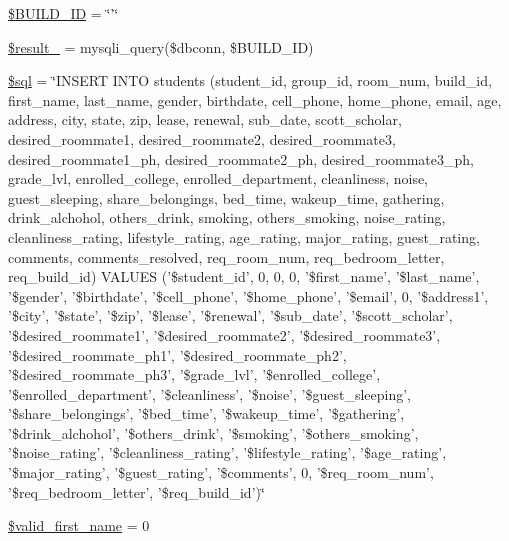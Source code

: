 \begin{DoxyCompactItemize}
\item 
\hyperlink{user__view_2validate_2studentVal_8php_a4003cf8da4c94911cef7e69853cbac42}{\$\-B\-U\-I\-L\-D\-\_\-\-I\-D} = \char`\"{}'\char`\"{}
\item 
\hyperlink{user__view_2validate_2studentVal_8php_a0b3f63d6f969a6ad92963ceae90afab9}{\$result\-\_} = mysqli\-\_\-query(\$dbconn, \$\-B\-U\-I\-L\-D\-\_\-\-I\-D)
\item 
\hyperlink{user__view_2validate_2studentVal_8php_a047170d6020a882807665812a27e2525}{\$sql} = \char`\"{}\-I\-N\-S\-E\-R\-T \-I\-N\-T\-O students (student\-\_\-id, group\-\_\-id, room\-\_\-num, build\-\_\-id, first\-\_\-name, last\-\_\-name, gender, birthdate, cell\-\_\-phone, home\-\_\-phone, email, age, address, city, state, zip, lease, renewal, sub\-\_\-date, scott\-\_\-scholar, desired\-\_\-roommate1, desired\-\_\-roommate2, desired\-\_\-roommate3, desired\-\_\-roommate1\-\_\-ph, desired\-\_\-roommate2\-\_\-ph, desired\-\_\-roommate3\-\_\-ph, grade\-\_\-lvl, enrolled\-\_\-college, enrolled\-\_\-department, cleanliness, noise, guest\-\_\-sleeping, share\-\_\-belongings, bed\-\_\-time, wakeup\-\_\-time, gathering, drink\-\_\-alchohol, others\-\_\-drink, smoking, others\-\_\-smoking, noise\-\_\-rating, cleanliness\-\_\-rating, lifestyle\-\_\-rating, age\-\_\-rating, major\-\_\-rating, guest\-\_\-rating, comments, comments\-\_\-resolved, req\-\_\-room\-\_\-num, req\-\_\-bedroom\-\_\-letter, req\-\_\-build\-\_\-id) \-V\-A\-L\-U\-E\-S ('\$student\-\_\-id', 0, 0, 0, '\$first\-\_\-name', '\$last\-\_\-name', '\$gender', '\$birthdate', '\$cell\-\_\-phone', '\$home\-\_\-phone', '\$email', 0, '\$address1', '\$city', '\$state', '\$zip', '\$lease', '\$renewal', '\$sub\-\_\-date', '\$scott\-\_\-scholar', '\$desired\-\_\-roommate1', '\$desired\-\_\-roommate2', '\$desired\-\_\-roommate3', '\$desired\-\_\-roommate\-\_\-ph1', '\$desired\-\_\-roommate\-\_\-ph2', '\$desired\-\_\-roommate\-\_\-ph3', '\$grade\-\_\-lvl', '\$enrolled\-\_\-college', '\$enrolled\-\_\-department', '\$cleanliness', '\$noise', '\$guest\-\_\-sleeping', '\$share\-\_\-belongings', '\$bed\-\_\-time', '\$wakeup\-\_\-time', '\$gathering', '\$drink\-\_\-alchohol', '\$others\-\_\-drink', '\$smoking', '\$others\-\_\-smoking', '\$noise\-\_\-rating', '\$cleanliness\-\_\-rating', '\$lifestyle\-\_\-rating', '\$age\-\_\-rating', '\$major\-\_\-rating', '\$guest\-\_\-rating', '\$comments', 0, '\$req\-\_\-room\-\_\-num', '\$req\-\_\-bedroom\-\_\-letter', '\$req\-\_\-build\-\_\-id')\char`\"{}
\item 
\hyperlink{user__view_2validate_2studentVal_8php_aab31ac46f64a6e5460bfe9ae7d267c29}{\$valid\-\_\-first\-\_\-name} = 0

\end{DoxyCompactItemize}
